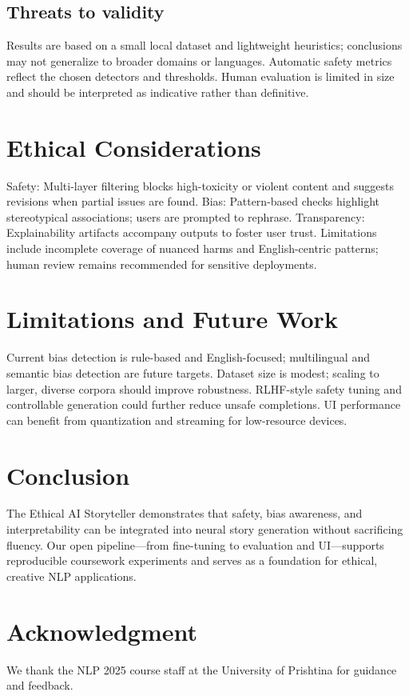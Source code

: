 \documentclass[conference]{IEEEtran}
\begin{document}
\subsection{Threats to validity}
Results are based on a small local dataset and lightweight heuristics; conclusions may not generalize to broader domains or languages. Automatic safety metrics reflect the chosen detectors and thresholds. Human evaluation is limited in size and should be interpreted as indicative rather than definitive.

\section{Ethical Considerations}
Safety: Multi-layer filtering blocks high-toxicity or violent content and suggests revisions when partial issues are found. Bias: Pattern-based checks highlight stereotypical associations; users are prompted to rephrase. Transparency: Explainability artifacts accompany outputs to foster user trust. Limitations include incomplete coverage of nuanced harms and English-centric patterns; human review remains recommended for sensitive deployments.

\section{Limitations and Future Work}
Current bias detection is rule-based and English-focused; multilingual and semantic bias detection are future targets. Dataset size is modest; scaling to larger, diverse corpora should improve robustness. RLHF-style safety tuning and controllable generation could further reduce unsafe completions. UI performance can benefit from quantization and streaming for low-resource devices.

\section{Conclusion}
The Ethical AI Storyteller demonstrates that safety, bias awareness, and interpretability can be integrated into neural story generation without sacrificing fluency. Our open pipeline---from fine-tuning to evaluation and UI---supports reproducible coursework experiments and serves as a foundation for ethical, creative NLP applications.

\section*{Acknowledgment}
We thank the NLP 2025 course staff at the University of Prishtina for guidance and feedback.
\end{document}
